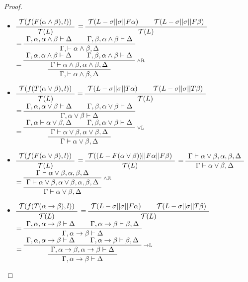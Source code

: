 \documentclass[runningheads]{llncs}
\begin{document}
\begin{proof}
{\begin {itemize}
    \item 
    $\AxiomC{$\mathcal{T}( f(F(\alpha \land \beta),l))$}\UnaryInfC{$\mathcal{T}(L)$}\DisplayProof$ 
    $=\AxiomC{$\mathcal{T}( L - \sigma|| \sigma || F \alpha) $}\AxiomC{$\mathcal{T}( L - \sigma|| \sigma || F \beta) $}\BinaryInfC{$\mathcal{T}(L)$}\DisplayProof$
    $=\AxiomC{$\Gamma ,\alpha, \alpha \land \beta \vdash \Delta$}\AxiomC{$\Gamma , \beta, \alpha \land \beta \vdash \Delta$}\BinaryInfC{$\Gamma,\vdash  \alpha \land \beta  ,\Delta$}\DisplayProof$
    $=\RightLabel{\scriptsize{$\land$R}}\AxiomC{$\Gamma ,\alpha, \alpha \land \beta \vdash \Delta$}\AxiomC{$\Gamma , \beta, \alpha \land \beta \vdash \Delta$}\BinaryInfC{$\Gamma \vdash  \alpha \land \beta ,\alpha \land \beta, \Delta$}\UnaryInfC{$\Gamma,\vdash  \alpha \land \beta  ,\Delta$}\DisplayProof$
    \item 
$\AxiomC{$\mathcal{T}( f(T(\alpha \lor \beta),l))$}\UnaryInfC{$\mathcal{T}(L)$}\DisplayProof$ 
$=\AxiomC{$\mathcal{T}( L - \sigma|| \sigma || T \alpha)$}\AxiomC{$\mathcal{T}( L - \sigma|| \sigma || T \beta)$}\BinaryInfC{$\mathcal{T}(L)$}\DisplayProof$
$=\AxiomC{$\Gamma ,\alpha , \alpha \lor \beta \vdash \Delta$}\AxiomC{$\Gamma ,\beta, \alpha \lor \beta \vdash \Delta$}\BinaryInfC{$\Gamma, \alpha \lor \beta \vdash \Delta$}\DisplayProof$
$=\RightLabel{\scriptsize{$\lor$L}} \AxiomC{$\Gamma ,\alpha \vdash  \alpha \lor \beta,\Delta$}\AxiomC{$\Gamma , \beta, \alpha \lor \beta \vdash \Delta$}\BinaryInfC{$\Gamma \vdash  \alpha \lor \beta,\alpha \lor \beta ,\Delta$}\UnaryInfC{$\Gamma \vdash  \alpha \lor \beta ,\Delta$}\DisplayProof$
\item 
$\AxiomC{$\mathcal{T}( f(F(\alpha \lor \beta),l))$}\UnaryInfC{$\mathcal{T}(L)$}\DisplayProof$ 
$=\AxiomC{$\mathcal{T}( (L-F(\alpha \lor \beta))||F \alpha||F \beta)$}\UnaryInfC{$\mathcal{T}(L)$}\DisplayProof$
$=\AxiomC{$\Gamma \vdash \alpha \lor \beta,\alpha,\beta,\Delta$}\UnaryInfC{$\Gamma \vdash \alpha \lor \beta, \Delta$}\DisplayProof$
$=\RightLabel{\scriptsize{$\land$R}}\AxiomC{$\Gamma \vdash \alpha \lor \beta,\alpha,\beta,\Delta$}\UnaryInfC{$\Gamma \vdash \alpha \lor \beta,\alpha \lor \beta,\alpha,\beta,\Delta$}\UnaryInfC{$\Gamma \vdash \alpha \lor \beta, \Delta$}\DisplayProof$
\item 

$\AxiomC{$\mathcal{T}( f(T(\alpha \rightarrow \beta),l))$}\UnaryInfC{$\mathcal{T}(L)$}\DisplayProof$  
$=\AxiomC{$\mathcal{T}( L - \sigma|| \sigma || F \alpha )$}\AxiomC{$\mathcal{T}( L - \sigma|| \sigma || T \beta ) $}\BinaryInfC{$\mathcal{T}(L)$}\DisplayProof$  
$=\AxiomC{$\Gamma, \alpha, \alpha \rightarrow \beta \vdash \Delta$}\AxiomC{$\Gamma, \alpha \rightarrow \beta \vdash  \beta, \Delta$}\BinaryInfC{$\Gamma, \alpha \rightarrow \beta \vdash \Delta$}\DisplayProof$  
$=\RightLabel{\scriptsize{$\rightarrow$L}}\AxiomC{$\Gamma, \alpha, \alpha \rightarrow \beta \vdash \Delta$}\AxiomC{$\Gamma, \alpha \rightarrow \beta \vdash  \beta, \Delta$}\BinaryInfC{$\Gamma, \alpha \rightarrow \beta,\alpha \rightarrow \beta  \vdash \Delta$}\UnaryInfC{$\Gamma, \alpha \rightarrow \beta \vdash \Delta$}\DisplayProof$  


\end{itemize}}
\end{proof}
\end{document}
